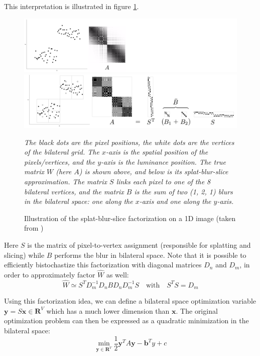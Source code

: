 \documentclass{article}
\begin{document}
This interpretation is illustrated in figure \ref{fig:SBS2}.

\begin{figure}
    \centering
    \hspace{0.3cm}\includegraphics[width=14cm]{pictures/SBS2_0.png}
    \includegraphics[width=14cm]{pictures/SBS2.png}
    \caption{Illustration of the splat-blur-slice factorization on a 1D image (taken from \cite{barron_fast_2015})}
    {\it \small The black dots are the pixel positions, the white dots are the vertices of the bilateral grid. The $x$-axis is the spatial position of the pixels/vertices, and the $y$-axis is the luminance position. The true matrix $W$ (here $A$) is shown above, and below is its splat-blur-slice approximation. The matrix $S$ links each pixel to one of the 8 bilateral vertices, and the matrix $B$ is the sum of two (1, 2, 1) blurs in the bilateral space: one along the $x$-axis and one along the $y$-axis.}
    \label{fig:SBS2}
\end{figure}

\medskip

Here $S$ is the matrix of pixel-to-vertex assignment (responsible for splatting and slicing) while $B$ performs the blur in bilateral space. Note that it is possible to efficiently bistochastize this factorization with diagonal matrices $D_n$ and $D_m$, in order to approximately factor $\hat{W}$ as well:
\begin{equation}
    \hat{W} \simeq S^T D_m^{-1} D_n B D_n D_m^{-1} S \quad \text{with} \quad S^T S = D_m
\end{equation}

\medskip

Using this factorization idea, we can define a bilateral space optimization variable $\textbf{y} = S \textbf{x} \in \textbf{R}^V$ which has a much lower dimension than $\textbf{x}$. The original optimization problem can then be expressed as a quadratic minimization in the bilateral space:
\begin{equation} \label{optim2}
    \min_{\textbf{y} \in \textbf{R}^V} \frac{1}{2}\textbf{y}^T A \textbf{y} - \textbf{b}^T y + c
\end{equation}
\end{document}
